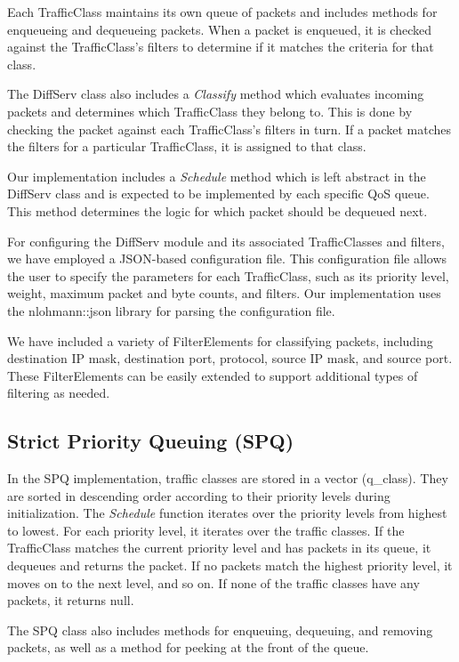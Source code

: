 \documentclass{article}
\begin{document}
Each TrafficClass maintains its own queue of packets and includes methods for enqueueing and dequeueing packets. When a packet is enqueued, it is checked against the TrafficClass's filters to determine if it matches the criteria for that class.

The DiffServ class also includes a \textit{Classify} method which evaluates incoming packets and determines which TrafficClass they belong to. This is done by checking the packet against each TrafficClass's filters in turn. If a packet matches the filters for a particular TrafficClass, it is assigned to that class.

Our implementation includes a \textit{Schedule} method which is left abstract in the DiffServ class and is expected to be implemented by each specific QoS queue. This method determines the logic for which packet should be dequeued next.

For configuring the DiffServ module and its associated TrafficClasses and filters, we have employed a JSON-based configuration file. This configuration file allows the user to specify the parameters for each TrafficClass, such as its priority level, weight, maximum packet and byte counts, and filters. Our implementation uses the nlohmann::json library for parsing the configuration file.

We have included a variety of FilterElements for classifying packets, including destination IP mask, destination port, protocol, source IP mask, and source port. These FilterElements can be easily extended to support additional types of filtering as needed.

\subsection{Strict Priority Queuing (SPQ)}

In the SPQ implementation, traffic classes are stored in a vector (q\_class). They are sorted in descending order according to their priority levels during initialization. The \textit{Schedule} function iterates over the priority levels from highest to lowest. For each priority level, it iterates over the traffic classes. If the TrafficClass matches the current priority level and has packets in its queue, it dequeues and returns the packet. If no packets match the highest priority level, it moves on to the next level, and so on. If none of the traffic classes have any packets, it returns null. 

The SPQ class also includes methods for enqueuing, dequeuing, and removing packets, as well as a method for peeking at the front of the queue. 
\end{document}
